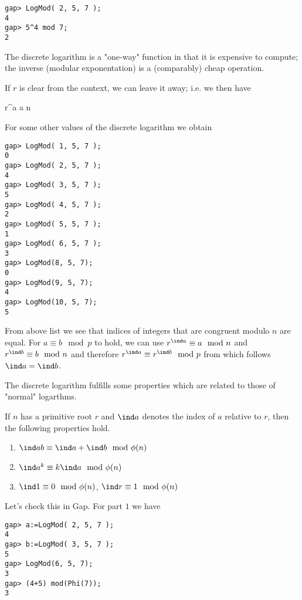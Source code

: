 \begin{verbatim}
gap> LogMod( 2, 5, 7 );
4
gap> 5^4 mod 7;
2
\end{verbatim}

The discrete logarithm is a "one-way" function in that it is expensive to compute; the inverse (modular exponentation) is a (comparably) cheap operation.

If $r$ is clear from the context, we can leave it away; i.e. we then have

\bee
r^{\ind a} \equiv a \mod n
\eee

For some other values of the discrete logarithm we obtain

\begin{verbatim}
gap> LogMod( 1, 5, 7 );
0
gap> LogMod( 2, 5, 7 );
4
gap> LogMod( 3, 5, 7 );
5
gap> LogMod( 4, 5, 7 );
2
gap> LogMod( 5, 5, 7 );
1
gap> LogMod( 6, 5, 7 );
3
gap> LogMod(8, 5, 7);
0
gap> LogMod(9, 5, 7);
4
gap> LogMod(10, 5, 7);
5
\end{verbatim}

From above list  we see that indices of integers that are congruent modulo $n$ are equal. For $a \equiv b \mod p$ to hold, we can use $r^{\ind a} \equiv a \mod n$ and $r^{\ind b} \equiv b \mod n$ and therefore $r^{\ind a} \equiv r^{\ind b} \mod p$ from which follows $\ind a = \ind b$.


The discrete logarithm fulfills some properties which are related to those of "normal" logarthms.

\begin{theorem}
  If $n$ has a primitive root $r$ and $\ind a $ denotes the index of $a$ relative to $r$, then the following properties hold.

  \begin{enumerate}
    \item $\ind ab \equiv \ind a + \ind b \mod \phi(n)$
    \item $\ind a^k \equiv k \ind a \mod \phi(n)$
    \item $\ind 1 \equiv 0 \mod \phi(n)$, $\ind r \equiv 1 \mod \phi(n)$
  \end{enumerate}

\end{theorem}

Let's check this in Gap. For part $1$ we have

\begin{verbatim}
gap> a:=LogMod( 2, 5, 7 );
4
gap> b:=LogMod( 3, 5, 7 );
5
gap> LogMod(6, 5, 7);
3
gap> (4+5) mod(Phi(7));
3
\end{verbatim}

